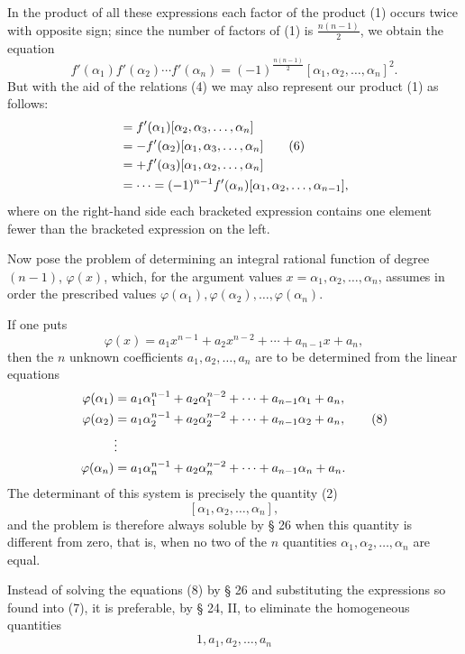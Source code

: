 
In the product of all these expressions each factor of the product (1) occurs twice with opposite sign; since the number of factors of (1) is $\frac{n(n-1)}{2}$, we obtain the equation
\begin{equation}
 f'(\alpha_1)f'(\alpha_2)\cdots f'(\alpha_n)=(-1)^{\frac{n(n-1)}2}[\alpha_1,\alpha_2,\ldots,\alpha_n]^2.\tag{5}
\end{equation}
But with the aid of the relations (4) we may also represent our product (1) as follows:
\begin{align}
 [\alpha_1,\alpha_2,\ldots,\alpha_n]
 &= f'(\alpha_1)[\alpha_2,\alpha_3,\ldots,\alpha_n]\notag\\
 &=-f'(\alpha_2)[\alpha_1,\alpha_3,\ldots,\alpha_n]\tag{6}\\
 &=+f'(\alpha_3)[\alpha_1,\alpha_2,\ldots,\alpha_n]\notag\\%
 &=\cdots=(-1)^{n-1}f'(\alpha_n)[\alpha_1,\alpha_2,\ldots,\alpha_{n-1}],\notag
\end{align}
where on the right-hand side each bracketed expression contains one element fewer than the bracketed expression on the left.

Now pose the problem of determining an integral rational function of degree $(n-1)$, $\varphi(x)$, which, for the argument values $x=\alpha_1,\alpha_2,
\ldots,\alpha_n$, assumes in order the prescribed values $\varphi(\alpha_1),\varphi(\alpha_2),\ldots,\varphi(\alpha_n)$.

If one puts
\begin{equation}
 \varphi(x)=a_1x^{n-1}+a_2x^{n-2}+\cdots+a_{n-1}x+a_n,\tag{7}
\end{equation}
then the $n$ unknown coefficients $a_1,a_2,
\ldots,a_n$ are to be determined from the linear equations
\begin{align}
 \varphi(\alpha_1)&=a_1\alpha_1^{n-1}+a_2\alpha_1^{n-2}+\cdots+a_{n-1}\alpha_1+a_n,\notag\\
 \varphi(\alpha_2)&=a_1\alpha_2^{n-1}+a_2\alpha_2^{n-2}+\cdots+a_{n-1}\alpha_2+a_n,\tag{8}\\
 &\vdots\notag\\
 \varphi(\alpha_n)&=a_1\alpha_n^{n-1}+a_2\alpha_n^{n-2}+\cdots+a_{n-1}\alpha_n+a_n.\notag
\end{align}
The determinant of this system is precisely the quantity (2)
\[
[\alpha_1,\alpha_2,\ldots,\alpha_n],
\]
and the problem is therefore always soluble by § 26 when this quantity is different from zero, that is, when no two of the $n$ quantities $\alpha_1,\alpha_2,
\ldots,\alpha_n$ are equal.

Instead of solving the equations (8) by § 26 and substituting the expressions so found into (7), it is preferable, by § 24, II, to eliminate the homogeneous quantities
\[
1,a_1,a_2,\ldots,a_n
\]
